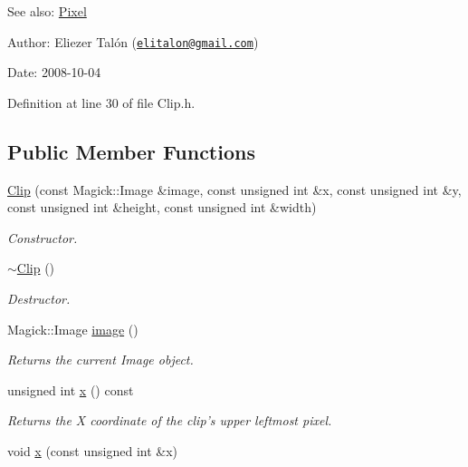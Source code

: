 \begin{Desc}
\item[See also:]\hyperlink{class_pixel}{Pixel}\end{Desc}
\begin{Desc}
\item[Author:]Eliezer Talón (\href{mailto:elitalon@gmail.com}{\tt elitalon@gmail.com}) \end{Desc}
\begin{Desc}
\item[Date:]2008-10-04 \end{Desc}


Definition at line 30 of file Clip.h.\subsection*{Public Member Functions}
\begin{CompactItemize}
\item 
\hyperlink{class_clip_cf1b75d1f0a7b7fb4c9b7cf6fe904bde}{Clip} (const Magick::Image \&image, const unsigned int \&x, const unsigned int \&y, const unsigned int \&height, const unsigned int \&width)
\begin{CompactList}\small\item\em Constructor. \item\end{CompactList}\item 
\hyperlink{class_clip_88647ed65e3482b5e0533ec98667b0fa}{$\sim$Clip} ()
\begin{CompactList}\small\item\em Destructor. \item\end{CompactList}\item 
Magick::Image \hyperlink{class_clip_488b36e7868e93a60123135b0a4ac2ea}{image} ()
\begin{CompactList}\small\item\em Returns the current Image object. \item\end{CompactList}\item 
unsigned int \hyperlink{class_clip_de984337b7b13fb63a3d3b1797b544c8}{x} () const 
\begin{CompactList}\small\item\em Returns the X coordinate of the clip's upper leftmost pixel. \item\end{CompactList}\item 
void \hyperlink{class_clip_7617cb2fcd294e990293e5bd4854f949}{x} (const unsigned int \&x)

\end{CompactItemize}
